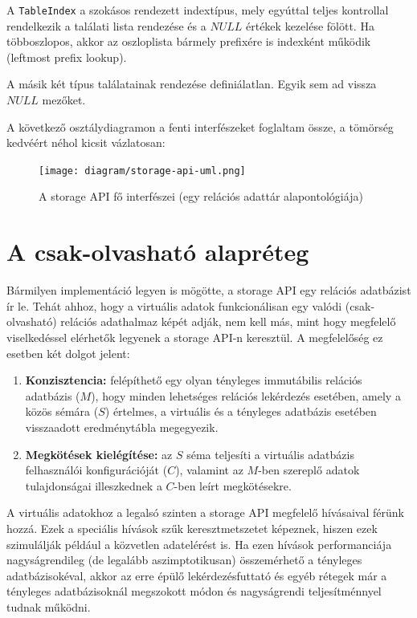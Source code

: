 \documentclass[
    parspace,
    noindent,
    nohyp,
]{elteiktdk}[2023/04/10]
\begin{document}
A \texttt{TableIndex} a szokásos rendezett indextípus,
mely egyúttal teljes kontrollal rendelkezik a találati lista rendezése
és a $NULL$ értékek kezelése fölött.
Ha többoszlopos, akkor az oszloplista bármely prefixére is indexként működik (leftmost prefix lookup).

A másik két típus találatainak rendezése definiálatlan.
Egyik sem ad vissza $NULL$ mezőket.

A következő osztálydiagramon a fenti interfészeket foglaltam össze,
a tömörség kedvéért néhol kicsit vázlatosan:

\begin{figure}[H]
\centering
\texttt{[image: diagram/storage-api-uml.png]}
\caption{A storage API fő interfészei (egy relációs adattár alapontológiája)}
\end{figure}


\section{A csak-olvasható alapréteg}

Bármilyen implementáció legyen is mögötte, a storage API egy relációs adatbázist ír le.
Tehát ahhoz, hogy a virtuális adatok funkcionálisan egy valódi (csak-olvasható) relációs adathalmaz képét adják,
nem kell más, mint hogy megfelelő viselkedéssel elérhetők legyenek a storage API-n keresztül.
A megfelelőség ez esetben két dolgot jelent:

\begin{enumerate}
  \item \textbf{Konzisztencia:}
        felépíthető egy olyan tényleges immutábilis relációs adatbázis ($M$),
        hogy minden lehetséges relációs lekérdezés esetében, amely a közös sémára ($S$) értelmes,
        a virtuális és a tényleges adatbázis esetében visszaadott eredménytábla megegyezik.
  \item \textbf{Megkötések kielégítése:}
        az $S$ séma teljesíti a virtuális adatbázis felhasználói konfigurációját ($C$),
        valamint az $M$-ben szereplő adatok tulajdonságai illeszkednek a $C$-ben leírt megkötésekre.
\end{enumerate}

A virtuális adatokhoz a legalsó szinten a storage API megfelelő hívásaival férünk hozzá.
Ezek a speciális hívások szűk keresztmetszetet képeznek,
hiszen ezek szimulálják például a közvetlen adatelérést is.
Ha ezen hívások performanciája nagyságrendileg (de legalább aszimptotikusan) összemérhető a tényleges adatbázisokéval,
akkor az erre épülő lekérdezésfuttató és egyéb rétegek már
a tényleges adatbázisoknál megszokott módon és nagyságrendi teljesítménnyel tudnak működni.
\end{document}
